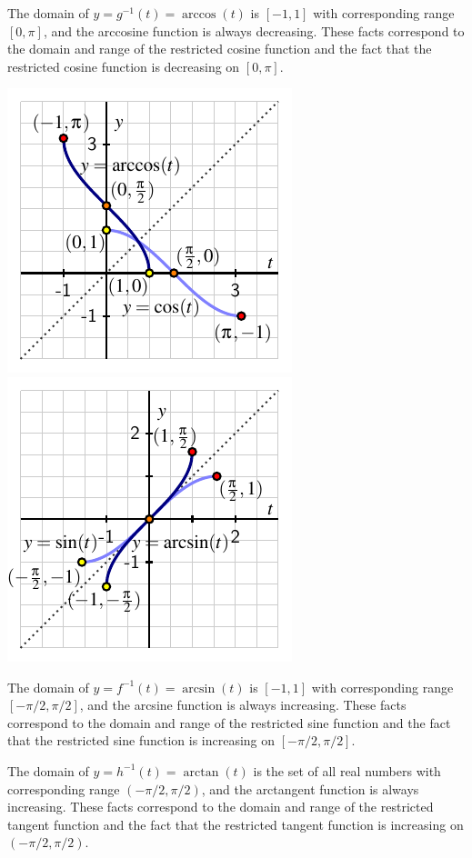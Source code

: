 \documentclass{ximera}
\begin{document}
\begin{summary}
\begin{itemize}
The domain of $y = g^{-1}(t) = \arccos(t)$ is $[-1,1]$ with corresponding range $[0,\pi]$, and the arccosine function is always decreasing.  These facts correspond to the domain and range of the restricted cosine function and the fact that the restricted cosine function is decreasing on $[0,\pi]$.
\begin{image}
\includegraphics[width = .49\linewidth]{inverse-trig-arccos-graph.pdf}
\includegraphics[width = .49\linewidth]{inverse-trig-arcsin-graph.pdf}
\end{image}
\par
The domain of $y = f^{-1}(t) = \arcsin(t)$ is $[-1,1]$ with corresponding range $[-\pi/2, \pi/2]$, and the arcsine function is always increasing.  These facts correspond to the domain and range of the restricted sine function and the fact that the restricted sine function is increasing on $[-\pi/2,\pi/2]$.%
\par
The domain of $y = h^{-1}(t) = \arctan(t)$ is the set of all real numbers with corresponding range $(-\pi/2, \pi/2)$, and the arctangent function is always increasing.  These facts correspond to the domain and range of the restricted tangent function and the fact that the restricted tangent function is increasing on $(-\pi/2,\pi/2)$.%
\begin{image}

\end{image}
\end{itemize}
\end{summary}
\end{document}
